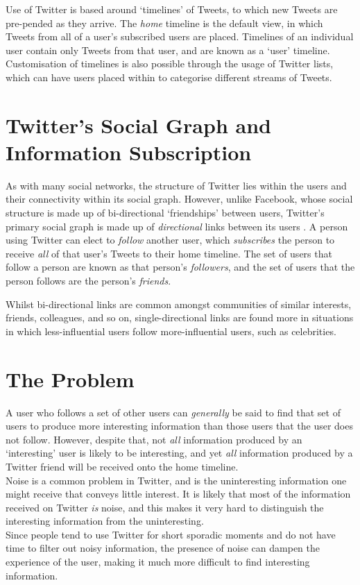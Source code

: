 Use of Twitter is based around `timelines' of Tweets, to which new Tweets are pre-pended as they arrive. The \textit{home} timeline is the default view, in which Tweets from all of a user's subscribed users are placed. Timelines of an individual user contain only Tweets from that user, and are known as a `user' timeline. Customisation of timelines is also possible through the usage of Twitter lists, which can have users placed within to categorise different streams of Tweets.


\section{Twitter's Social Graph and Information Subscription}
As with many social networks, the structure of Twitter lies within the users and their connectivity within its social graph. However, unlike Facebook, whose social structure is made up of bi-directional `friendships' between users, Twitter's primary social graph is made up of \textit{directional} links between its users \cite{edwards13}. A person using Twitter can elect to \textit{follow} another user, which \textit{subscribes} the person to receive \textit{all} of that user's Tweets to their home timeline. The set of users that follow a person are known as that person's \textit{followers}, and the set of users that the person follows are the person's \textit{friends}.

Whilst bi-directional links are common amongst communities of similar interests, friends, colleagues, and so on, single-directional links are found more in situations in which less-influential users follow more-influential users, such as celebrities.


\section{The Problem}
A user who follows a set of other users can \textit{generally} be said to find that set of users to produce more interesting information than those users that the user does not follow. However, despite that, not \textit{all} information produced by an `interesting' user is likely to be interesting, and yet \textit{all} information produced by a Twitter friend will be received onto the home timeline.\\
Noise is a common problem in Twitter, and is the uninteresting information one might receive that conveys little interest. It is likely that most of the information received on Twitter \textit{is} noise, and this makes it very hard to distinguish the interesting information from the uninteresting.\\
Since people tend to use Twitter for short sporadic moments and do not have time to filter out noisy information, the presence of noise can dampen the experience of the user, making it much more difficult to find interesting information.

